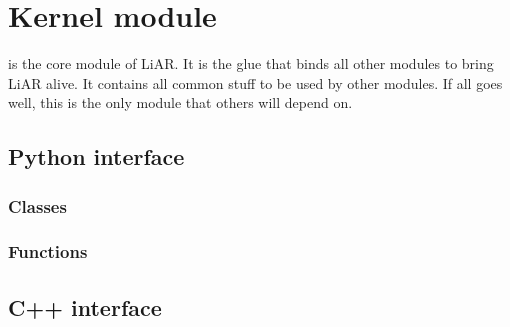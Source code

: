 %

\chapter{Kernel module}

 is the core module of LiAR.  It is the glue that binds all other modules to bring LiAR alive.  It contains all common stuff to be used by other modules.  If all goes well, this is the only module that others will depend on.

\section{Python interface}

\subsection{Classes}

\subsection{Functions}


\section{C++ interface}
